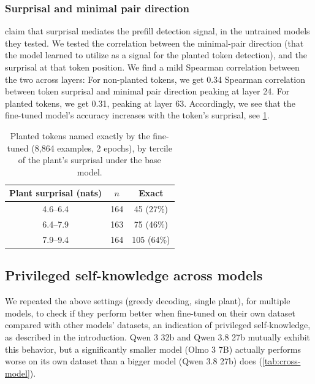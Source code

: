 \subsubsection{Surprisal and minimal pair direction}
\citet{g2026enaction} claim that surprisal mediates the prefill detection signal, in the untrained models they tested. We tested the correlation between the minimal-pair direction (that the model learned to utilize as a signal for the planted token detection), and the surprisal at that token position. We find a mild Spearman correlation between the two across layers: For non-planted tokens, we get 0.34 Spearman correlation between token surprisal and minimal pair direction peaking at layer 24. For planted tokens, we get 0.31, peaking at layer 63. Accordingly, we see that the fine-tuned model's accuracy increases with the token's surprisal, see \cref{tab:surprisal-terciles}.

\begin{table}[t]
\centering
\caption{Planted tokens named exactly by the fine-tuned \qwenA{} (8{,}864 examples, 2 epochs), by tercile of the plant's surprisal under the base model.}
\label{tab:surprisal-terciles}
\begin{tabular}{ccc}
\toprule
Plant surprisal (nats) & $n$ & Exact \\
\midrule
4.6--6.4 & 164 & \phantom{0}45 (27\%) \\
6.4--7.9 & 163 & \phantom{0}75 (46\%) \\
7.9--9.4 & 164 & 105 (64\%) \\
\bottomrule
\end{tabular}
\end{table}


\subsection{Privileged self-knowledge across models}
\label{sec:localisation-cross}
We repeated the above settings (greedy decoding, single plant), for multiple models, to check if they perform better when fine-tuned on their own dataset compared with other models' datasets, an indication of privileged self-knowledge, as described in the introduction. Qwen 3 32b and Qwen 3.8 27b mutually exhibit this behavior, but a significantly smaller model (Olmo 3 7B) actually performs worse on its own dataset than a bigger model (Qwen 3.8 27b) does (\cref{tab:cross-model}).



